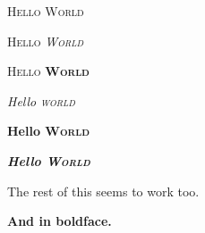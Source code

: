\documentclass{article}
\begin{document}
\textsc{Hello World}

\textsc{Hello \emph{World}}

\textsc{Hello \textbf{World}}

\emph{Hello \textsc{world}}

\textbf{Hello \textsc{World}}

\textbf{\emph{Hello \textsc{World}}}

The rest of this seems to work too.

\textbf{And in boldface.}
\end{document}
